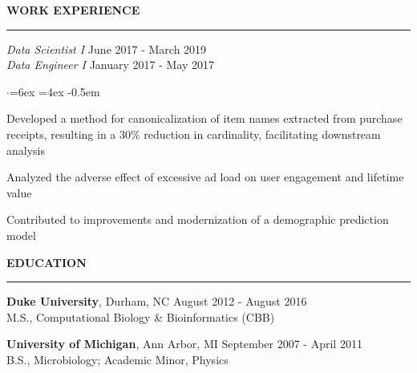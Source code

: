 \documentclass[11pt]{article}
\newenvironment{rSection}[1]{ %
  \sectionskip
  \MakeUppercase{\bf #1} %
  \sectionlineskip
  \hrule %
  \begin{list}{}{ %
    \setlength{\leftmargin}{1.5em} %
  }
  \item[]
}{
  \end{list}
}
\def\sectionlineskip{\smallskip} %
\def\sectionskip{\smallskip} %
\begin{document}
\begin{rSection}{Work Experience}
{\em \hspace*{2ex} Data Scientist I} \hfill June 2017 - March 2019 \\
{\em \hspace*{2ex} Data Engineer I} \hfill January 2017 - May 2017

\begin{list}{$\cdot$}{\leftmargin=6ex \rightmargin=4ex} %
   \itemsep -0.5em \vspace{-0.5em} %
   \item Developed a method for canonicalization of item names extracted from purchase receipts, resulting in a 30\% reduction in cardinality, facilitating downstream analysis
   \item Analyzed the adverse effect of excessive ad load on user engagement and lifetime value
   \item Contributed to improvements and modernization of a demographic prediction model
\end{list}

\end{rSection}


\begin{rSection}{Education}

{\bf Duke University}, Durham, NC \hfill August 2012 - August 2016 \\
\hspace*{2ex} M.S., Computational Biology \& Bioinformatics (CBB)

\vspace{-1ex}
{\bf University of Michigan}, Ann Arbor, MI \hfill September 2007 - April 2011 \\ 
\hspace*{2ex} B.S., Microbiology; Academic Minor, Physics

\end{rSection}
\end{document}
